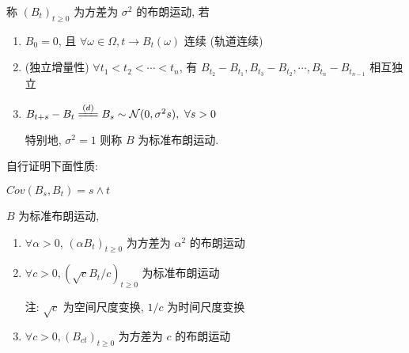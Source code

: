 \begin{definition}
    称 $(B_t)_{t\geq 0}$ 为方差为 $\sigma^2$ 的布朗运动, 若
    \begin{enumerate}
        \item $B_0=0$, 且 $\forall \omega\in\Omega, t\to B_t(\omega)$ 连续 (轨道连续)
        \item (独立增量性) $\forall t_1<t_2<\cdots<t_n$, 有 $B_{t_2}-B_{t_1}, B_{t_3}-B_{t_2}, \cdots, B_{t_n}-B_{t_{n-1}}$ 相互独立
        \item $B_{t+s}-B_t\xlongequal{(d)}B_s\sim \mc{N}(0,\sigma^2 s),\ \forall s>0$
        
        特别地, $\sigma^2=1$ 则称 $B$ 为标准布朗运动.
    \end{enumerate}
\end{definition}

自行证明下面性质:
\begin{property}
$Cov(B_s,B_t)=s\land t$
\end{property}

\begin{property}[尺度性质]
$B$ 为标准布朗运动,
\begin{enumerate}
    \item $\forall \alpha>0$, $(\alpha B_t)_{t\geq 0}$ 为方差为 $\alpha^2$ 的布朗运动
    \item $\forall c>0, (\sqrt{c}B_t/c)_{t\geq 0}$ 为标准布朗运动
    
    注: $\sqrt c$ 为空间尺度变换, $1/c$ 为时间尺度变换
    \item $\forall c>0,(B_{ct})_{t\geq 0}$ 为方差为 $c$ 的布朗运动
\end{enumerate}
\end{property}